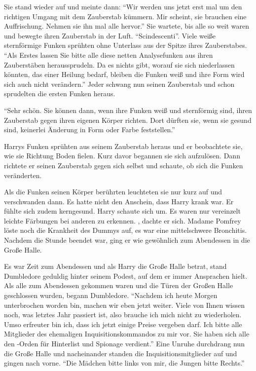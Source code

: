 Sie stand wieder auf und meinte dann: \enquote{Wir werden uns jetzt erst mal um den richtigen Umgang mit dem Zauberstab kümmern. Mir scheint, sie brauchen eine Auffrischung. Nehmen sie ihn mal alle hervor.} Sie wartete, bis alle so weit waren und bewegte ihren Zauberstab in der Luft. \enquote{Scindescenti}. Viele weiße sternförmige Funken sprühten ohne Unterlass aus der Spitze ihres Zauberstabes. \enquote{Als Erstes lassen Sie bitte alle diese netten Analysefunken aus ihren Zauberstäben heraussprudeln. Da es nichts gibt, worauf sie sich niederlassen könnten, das einer Heilung bedarf, bleiben die Funken weiß und ihre Form wird sich auch nicht verändern.} Jeder schwang nun seinen Zauberstab und schon sprudelten die ersten Funken heraus.

\enquote{Sehr schön. Sie können dann, wenn ihre Funken weiß und sternförmig sind, ihren Zauberstab gegen ihren eigenen Körper richten. Dort dürften sie, wenn sie gesund sind, keinerlei Änderung in Form oder Farbe feststellen.}

Harrys Funken sprühten aus seinem Zauberstab heraus und er beobachtete sie, wie sie Richtung Boden fielen. Kurz davor begannen sie sich aufzulösen. Dann richtete er seinen Zauberstab gegen sich selbst und schaute, ob sich die Funken veränderten.

Als die Funken seinen Körper berührten leuchteten sie nur kurz auf und verschwanden dann. Es hatte nicht den Anschein, dass Harry krank war. Er fühlte sich zudem kerngesund. Harry schaute sich um. Es waren nur vereinzelt leichte Färbungen bei anderen zu erkennen. , dachte er sich. Madame Pomfrey löste noch die Krankheit des Dummys auf, es war eine mittelschwere Bronchitis. Nachdem die Stunde beendet war, ging er wie gewöhnlich zum Abendessen in die Große Halle.

Es war Zeit zum Abendessen und als Harry die Große Halle betrat, stand Dumbledore geduldig hinter seinem Podest, auf dem er immer Ansprachen hielt. Als alle zum Abendessen gekommen waren und die Türen der Großen Halle geschlossen wurden, begann Dumbledore. \enquote{Nachdem ich heute Morgen unterbrochen worden bin, machen wir eben jetzt weiter. Viele von Ihnen wissen noch, was letztes Jahr passiert ist, also brauche ich mich nicht zu wiederholen. Umso erfreuter bin ich, dass ich jetzt einige Preise vergeben darf. Ich bitte alle Mitglieder des ehemaligen Inquisitionskommandos zu mir vor. Sie haben sich alle den -Orden für Hinterlist und Spionage verdient.} Eine Unruhe durchdrang nun die Große Halle und nacheinander standen die Inquisitionsmitglieder auf und gingen nach vorne. \enquote{Die Mädchen bitte links von mir, die Jungen bitte Rechts.}

